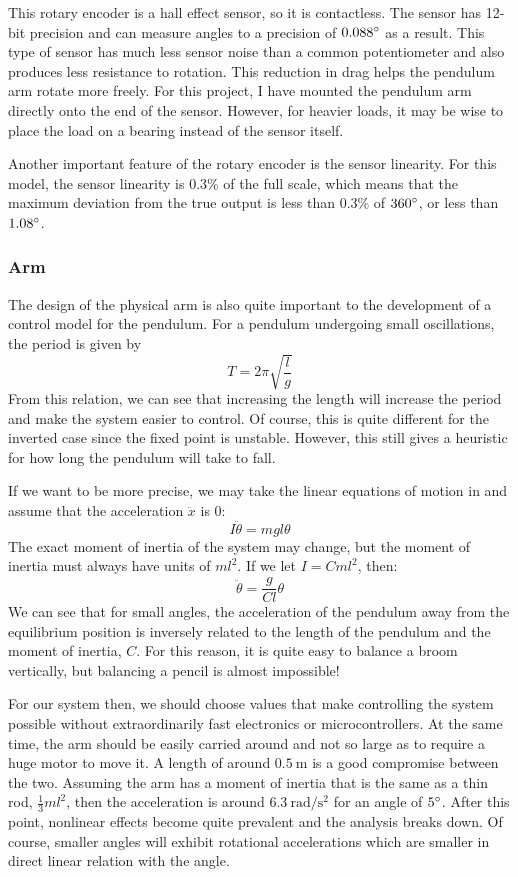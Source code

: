 This rotary encoder is a hall effect sensor, so it is contactless. The sensor has 12-bit precision and can measure angles to a precision of $0.088\degree$ as a result. This type of sensor has much less sensor noise than a common potentiometer and also produces less resistance to rotation. This reduction in drag helps the pendulum arm rotate more freely. For this project, I have mounted the pendulum arm directly onto the end of the sensor. However, for heavier loads, it may be wise to place the load on a bearing instead of the sensor itself.

Another important feature of the rotary encoder is the sensor linearity. For this model, the sensor linearity is 0.3\% of the full scale, which means that the maximum deviation from the true output is less than 0.3\% of $360\degree$, or less than $1.08\degree$.

\subsubsection{Arm}
The design of the physical arm is also quite important to the development of a control model for the pendulum. For a pendulum undergoing small oscillations, the period is given by 
$$T=2\pi\sqrt{\frac{l}{g}}$$
From this relation, we can see that increasing the length will increase the period and make the system easier to control. Of course, this is quite different for the inverted case since the fixed point is unstable. However, this still gives a heuristic for how long the pendulum will take to fall.

If we want to be more precise, we may take the linear equations of motion in  and assume that the acceleration $\ddot{x}$ is 0:
$$I\ddot{\theta}=mgl\theta$$
The exact moment of inertia of the system may change, but the moment of inertia must always have units of $ml^2$. If we let $I=Cml^2$, then:
$$\ddot{\theta}=\frac{g}{Cl}\theta$$
We can see that for small angles, the acceleration of the pendulum away from the equilibrium position is inversely related to the length of the pendulum and the moment of inertia, $C$. For this reason, it is quite easy to balance a broom vertically, but balancing a pencil is almost impossible!

For our system then, we should choose values that make controlling the system possible without extraordinarily fast electronics or microcontrollers. At the same time, the arm should be easily carried around and not so large as to require a huge motor to move it. A length of around $0.5\ \mathrm{m}$ is a good compromise between the two. Assuming the arm has a moment of inertia that is the same as a thin rod, $\frac{1}{3}ml^2$, then the acceleration is around $6.3 \ \mathrm{rad/s^2}$ for an angle of  $5\degree$. After this point, nonlinear effects become quite prevalent and the analysis breaks down. Of course, smaller angles will exhibit rotational accelerations which are smaller in direct linear relation with the angle.

